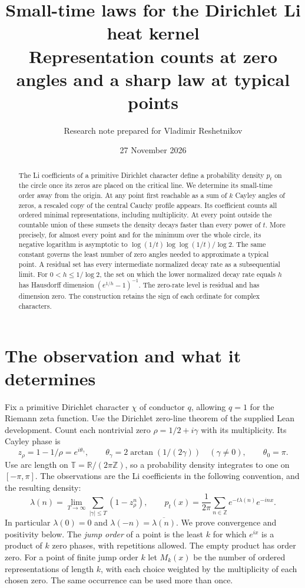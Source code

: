 \documentclass[11pt]{article}
\title{Small-time laws for the Dirichlet Li heat kernel\\[4pt]
\large Representation counts at zero angles and a sharp law at typical points}
\author{Research note prepared for Vladimir Reshetnikov}
\date{27 November 2026}
\theoremstyle{remark}\newtheorem{remark}[theorem]{Remark}
\newcommand{\R}{\mathbb R}\newcommand{\T}{\mathbb T}\newcommand{\Z}{\mathbb Z}\newcommand{\N}{\mathbb N}
\begin{document}
\maketitle
\begin{abstract}
The Li coefficients of a primitive Dirichlet character define a probability
density $p_t$ on the circle once its zeros are placed on the critical line.
We determine its small-time order away from the origin. At any point first
reachable as a sum of $k$ Cayley angles of zeros, a rescaled copy of the
central Cauchy profile appears. Its coefficient counts all ordered minimal
representations, including multiplicity. At every point outside the
countable union of these sumsets the density decays faster than every
power of $t$. More precisely, for almost every point and for the minimum
over the whole circle, its negative logarithm is asymptotic to
$\log(1/t)\log\log(1/t)/\log 2$. The same constant governs the least number
of zero angles needed to approximate a typical point. A residual set has
every intermediate normalized decay rate as a subsequential limit.
For $0<h\le1/\log2$, the set on which the lower normalized decay rate
equals $h$ has Hausdorff dimension $(e^{1/h}-1)^{-1}$. The zero-rate
level is residual and has dimension zero. The construction retains the
sign of each ordinate for complex characters.
\end{abstract}
\section{The observation and what it determines}
Fix a primitive Dirichlet character $\chi$ of conductor $q$, allowing $q=1$
for the Riemann zeta function. Use the Dirichlet zero-line theorem
of the supplied Lean development. Count each nontrivial zero
$\rho=1/2+i\gamma$ with its multiplicity. Its Cayley phase is
\[
 z_\rho=1-1/\rho=e^{i\theta_\gamma},\qquad
 \theta_\gamma=2\arctan(1/(2\gamma))\quad(\gamma\ne0),\qquad \theta_0=\pi.
\]
Use arc length on $\T=\R/(2\pi\Z)$, so a probability density integrates to
one on $[-\pi,\pi]$. The observations are the Li coefficients in the
following convention, and the resulting density:
\begin{equation}\label{eq:observation}
 \lambda(n)=\lim_{T\to\infty}\sum_{|\gamma|\le T}(1-z_\rho^n),
 \qquad p_t(x)=\frac1{2\pi}\sum_{n\in\Z}e^{-t\lambda(n)}e^{-inx}.
\end{equation}
In particular $\lambda(0)=0$ and $\lambda(-n)=\overline{\lambda(n)}$.
We prove convergence and positivity below. The \emph{jump order} of a point is the
least $k$ for which $e^{ix}$ is a product of $k$ zero phases, with
repetitions allowed. The empty product has order zero.
For a point of finite jump order $k$ let $M_k(x)$ be the number of ordered
representations of length $k$, with each choice weighted by the
multiplicity of each chosen zero. The same occurrence can be used more
than once.
\end{document}
